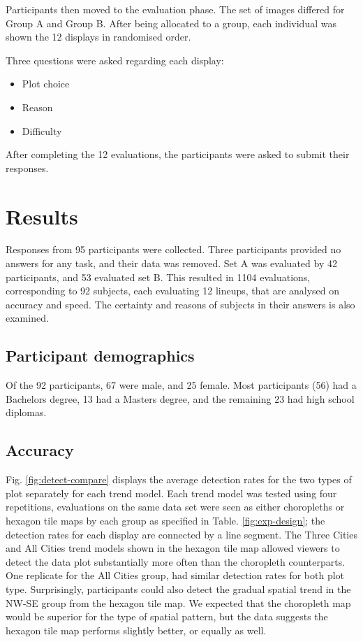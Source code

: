 \documentclass[conference,final,]{IEEEtran}
\providecommand{\tightlist}{%
  \setlength{\itemsep}{0pt}\setlength{\parskip}{0pt}}
\begin{document}
Participants then moved to the evaluation phase.
The set of images differed for Group A and Group B.
After being allocated to a group, each individual was shown the 12 displays in randomised order.

Three questions were asked regarding each display:

\begin{itemize}
\tightlist
\item
  Plot choice
\item
  Reason
\item
  Difficulty
\end{itemize}

After completing the 12 evaluations, the participants were asked to submit their responses.

\hypertarget{results}{%
\section{Results}\label{results}}

Responses from 95 participants were collected. Three participants provided no answers for any task, and their data was removed. Set A was evaluated by 42 participants, and 53 evaluated set B. This resulted in 1104 evaluations, corresponding to 92 subjects, each evaluating 12 lineups, that are analysed on accuracy and speed. The certainty and reasons of subjects in their answers is also examined.

\hypertarget{participant-demographics}{%
\subsection{Participant demographics}\label{participant-demographics}}

Of the 92 participants, 67 were male, and 25 female. Most participants (56) had a Bachelors degree, 13 had a Masters degree, and the remaining 23 had high school diplomas.

\hypertarget{accuracy}{%
\subsection{Accuracy}\label{accuracy}}

Fig. \ref{fig:detect-compare} displays the average detection rates for the two types of plot separately for each trend model. Each trend model was tested using four repetitions, evaluations on the same data set were seen as either choropleths or hexagon tile maps by each group as specified in Table. \ref{fig:exp-design}; the detection rates for each display are connected by a line segment. The Three Cities and All Cities trend models shown in the hexagon tile map allowed viewers to detect the data plot substantially more often than the choropleth counterparts. One replicate for the All Cities group, had similar detection rates for both plot type. Surprisingly, participants could also detect the gradual spatial trend in the NW-SE group from the hexagon tile map. We expected that the choropleth map would be superior for the type of spatial pattern, but the data suggests the hexagon tile map performs slightly better, or equally as well.
\end{document}
